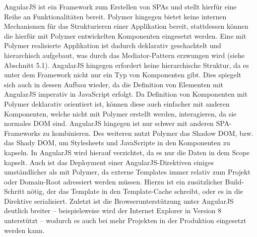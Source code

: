 AngularJS ist ein Framework zum Erstellen von \ac{SPA}s und stellt hierfür eine Reihe an Funktionalitäten bereit. Polymer hingegen bietet keine internen Mechanismen für das Strukturieren einer Applikation bereit, stattdessen können die hierfür mit Polymer entwickelten Komponenten eingesetzt werden. Eine mit Polymer realisierte Applikation ist dadurch deklarativ geschachtelt und hierarchisch aufgebaut, was durch das Mediator-Pattern erzwungen wird (siehe Abschnitt 5.1). AngularJS hingegen erfordert keine hierarchische Struktur, da es unter dem Framework nicht nur ein Typ von Komponenten gibt. Dies spiegelt sich auch in dessen Aufbau wieder, da die Definition von Elementen mit AngularJS imperativ in JavaScript erfolgt. Da Definition von Komponenten mit Polymer deklarativ orientiert ist, können diese auch einfacher mit anderen Komponenten, welche nicht mit Polymer erstellt werden, interagieren, da sie normales \ac{DOM} sind. AngularJS hingegen ist nur schwer mit anderen \ac{SPA}-Frameworks zu kombinieren. Des weiteren nutzt Polymer das Shadow \ac{DOM}, bzw. das Shady \ac{DOM}, um Stylesheets und JavaScripte in den Komponenten zu kapseln. In AngularJS wird hierauf verzichtet, da es nur die Daten in dem Scope kapselt. Auch ist das Deployment einer AngularJS-Direktiven einiges umständlicher als mit Polymer, da externe Templates immer relativ zum Projekt oder Domain-Root adressiert werden müssen. Hierzu ist ein zusätzlicher Build-Schritt nötig, der das Template in den Template-Cache schreibt, oder es in die Direktive serialisiert. Zuletzt ist die Browserunterstützung unter AngularJS deutlich breiter -- beispielsweise wird der Internet Explorer in Version 8 unterstützt -- wodurch es auch bei mehr Projekten in der Produktion eingesetzt werden kann.
